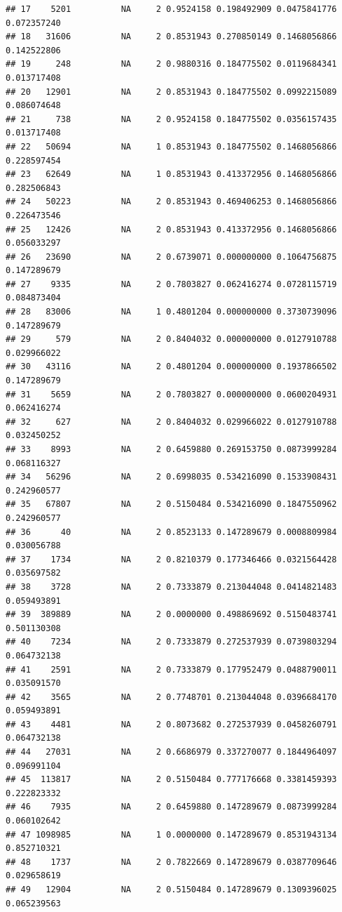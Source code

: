 \documentclass[10pt]{article}\usepackage[]{graphicx}\usepackage[]{color}
\makeatletter
\newenvironment{kframe}{%
 \def\at@end@of@kframe{}%
 \ifinner\ifhmode%
  \def\at@end@of@kframe{\end{minipage}}%
  \begin{minipage}{\columnwidth}%
 \fi\fi%
 \def\FrameCommand##1{\hskip\@totalleftmargin \hskip-\fboxsep
 \colorbox{shadecolor}{##1}\hskip-\fboxsep
     \hskip-\linewidth \hskip-\@totalleftmargin \hskip\columnwidth}%
 \MakeFramed {\advance\hsize-\width
   \@totalleftmargin\z@ \linewidth\hsize
   \@setminipage}}%
 {\par\unskip\endMakeFramed%
 \at@end@of@kframe}
\newenvironment{knitrout}{}{} %
\makeatother
\begin{document}
\begin{itemize}
\begin{knitrout}
\begin{kframe}
\begin{verbatim}
## 17    5201          NA     2 0.9524158 0.198492909 0.0475841776 0.072357240
## 18   31606          NA     2 0.8531943 0.270850149 0.1468056866 0.142522806
## 19     248          NA     2 0.9880316 0.184775502 0.0119684341 0.013717408
## 20   12901          NA     2 0.8531943 0.184775502 0.0992215089 0.086074648
## 21     738          NA     2 0.9524158 0.184775502 0.0356157435 0.013717408
## 22   50694          NA     1 0.8531943 0.184775502 0.1468056866 0.228597454
## 23   62649          NA     1 0.8531943 0.413372956 0.1468056866 0.282506843
## 24   50223          NA     2 0.8531943 0.469406253 0.1468056866 0.226473546
## 25   12426          NA     2 0.8531943 0.413372956 0.1468056866 0.056033297
## 26   23690          NA     2 0.6739071 0.000000000 0.1064756875 0.147289679
## 27    9335          NA     2 0.7803827 0.062416274 0.0728115719 0.084873404
## 28   83006          NA     1 0.4801204 0.000000000 0.3730739096 0.147289679
## 29     579          NA     2 0.8404032 0.000000000 0.0127910788 0.029966022
## 30   43116          NA     2 0.4801204 0.000000000 0.1937866502 0.147289679
## 31    5659          NA     2 0.7803827 0.000000000 0.0600204931 0.062416274
## 32     627          NA     2 0.8404032 0.029966022 0.0127910788 0.032450252
## 33    8993          NA     2 0.6459880 0.269153750 0.0873999284 0.068116327
## 34   56296          NA     2 0.6998035 0.534216090 0.1533908431 0.242960577
## 35   67807          NA     2 0.5150484 0.534216090 0.1847550962 0.242960577
## 36      40          NA     2 0.8523133 0.147289679 0.0008809984 0.030056788
## 37    1734          NA     2 0.8210379 0.177346466 0.0321564428 0.035697582
## 38    3728          NA     2 0.7333879 0.213044048 0.0414821483 0.059493891
## 39  389889          NA     2 0.0000000 0.498869692 0.5150483741 0.501130308
## 40    7234          NA     2 0.7333879 0.272537939 0.0739803294 0.064732138
## 41    2591          NA     2 0.7333879 0.177952479 0.0488790011 0.035091570
## 42    3565          NA     2 0.7748701 0.213044048 0.0396684170 0.059493891
## 43    4481          NA     2 0.8073682 0.272537939 0.0458260791 0.064732138
## 44   27031          NA     2 0.6686979 0.337270077 0.1844964097 0.096991104
## 45  113817          NA     2 0.5150484 0.777176668 0.3381459393 0.222823332
## 46    7935          NA     2 0.6459880 0.147289679 0.0873999284 0.060102642
## 47 1098985          NA     1 0.0000000 0.147289679 0.8531943134 0.852710321
## 48    1737          NA     2 0.7822669 0.147289679 0.0387709646 0.029658619
## 49   12904          NA     2 0.5150484 0.147289679 0.1309396025 0.065239563

\end{verbatim}
\end{kframe}
\end{knitrout}
\end{itemize}
\end{document}
